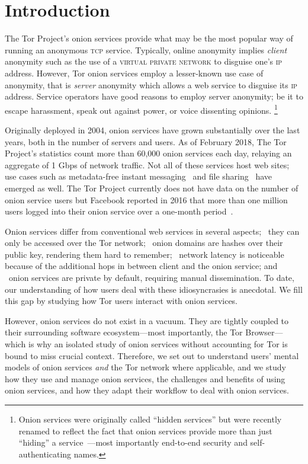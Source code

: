 \section{Introduction}
\label{sec:introduction}
The Tor Project's onion services provide what may be the
most popular way of running an anonymous \textsc{tcp} service. Typically, online anonymity implies \emph{client} anonymity
such as the use of a \textsc{virtual private network} to disguise one's \textsc{ip} address.  However, Tor onion services employ a lesser-known use case of anonymity, that is \emph{server} anonymity which allows a web service to
disguise its \textsc{ip} address.  Service operators have good reasons to employ
server anonymity; be it to escape harassment, speak out against power, or voice
dissenting opinions.  \footnote{Onion
services were originally called ``hidden services'' but were recently renamed to
reflect the fact that onion services provide more than just ``hiding'' a
service~\cite{Johnson2015a}---most importantly end-to-end security and
self-authenticating names.}

Originally deployed in 2004, onion services have grown substantially over the
last years, both in the number of servers and users.  As of February 2018, The
Tor Project's statistics count more than 60,000 onion services each day,
relaying an aggregate of 1 Gbps of network traffic.  Not all of these services
host web sites; use cases such as metadata-free instant
messaging~\cite{ricochet} and file sharing~\cite{onionshare} have emerged as
well.  The Tor Project currently does not have data on the number of onion
service users but Facebook reported in 2016 that more than one million users
logged into their onion service over a one-month period~\cite{facebook-users}.

Onion services differ from conventional web services in several aspects;
\first~they can only be accessed over the Tor network; \second~onion domains are
hashes over their public key, rendering them hard to remember; \third~network
latency is noticeable because of the additional hops in between client and the
onion service; and \fourth~onion services are private by default, requiring
manual dissemination.  To date, our understanding of how users deal with these
idiosyncrasies is anecdotal.  We fill this gap by studying how Tor users
interact with onion services.

However, onion services do not exist in a vacuum.
They are tightly coupled to their
surrounding software ecosystem---most importantly, the Tor Browser---which is why an
isolated study of onion services without accounting for Tor is bound to miss crucial context.  Therefore, we set out to understand users'
mental models of onion services \emph{and} the Tor network where applicable, and we study 
how they use and manage onion services, the challenges and benefits of using onion services, and how they adapt their workflow to deal with onion services.

